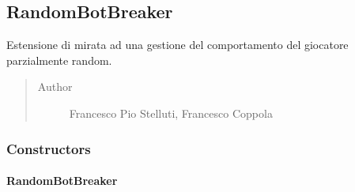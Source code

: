 \documentclass[letterpaper,10pt,italian]{sphinxmanual}
\begin{document}
\subsection{RandomBotBreaker}
\label{\detokenize{source/it/unicam/cs/pa/mastermind/players/RandomBotBreaker:randombotbreaker}}\label{\detokenize{source/it/unicam/cs/pa/mastermind/players/RandomBotBreaker::doc}}

\begin{fulllineitems}
\label{\detokenize{source/it/unicam/cs/pa/mastermind/players/RandomBotBreaker:it.unicam.cs.pa.mastermind.players.RandomBotBreaker}}
Estensione di  mirata ad una gestione del comportamento del giocatore parzialmente random.
\begin{quote}\begin{description}
\item[{Author}] \leavevmode
Francesco Pio Stelluti, Francesco Coppola

\end{description}\end{quote}

\end{fulllineitems}



\subsubsection{Constructors}
\label{\detokenize{source/it/unicam/cs/pa/mastermind/players/RandomBotBreaker:constructors}}

\paragraph{RandomBotBreaker}
\label{\detokenize{source/it/unicam/cs/pa/mastermind/players/RandomBotBreaker:id1}}

\begin{fulllineitems}
\label{\detokenize{source/it/unicam/cs/pa/mastermind/players/RandomBotBreaker:it.unicam.cs.pa.mastermind.players.RandomBotBreaker.RandomBotBreaker()}}
\end{fulllineitems}
\end{document}
